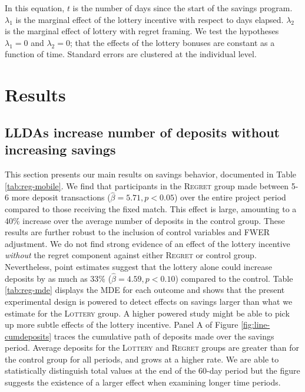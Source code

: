 \documentclass[12pt]{article}
\begin{document}
		In this equation, $t$ is the number of days since the start of the savings program. $\lambda_1$ is the marginal effect of the lottery incentive with respect to days elapsed. $\lambda_2$ is the marginal effect of lottery with regret framing. We test the hypotheses $\lambda_1 = 0$ and $\lambda_2 = 0$; that the effects of the lottery bonuses are constant as a function of time.  Standard errors are clustered at the individual level.

\section{Results} \label{sec:results}


	\subsection{LLDAs increase number of deposits without increasing savings}

		This section presents our main results on savings behavior, documented in Table \ref{tab:reg-mobile}. We find that participants in the \textsc{Regret} group made between 5-6 more deposit transactions ($\hat \beta = 5.71, p < 0.05$) over the entire project period compared to those receiving the fixed match. This effect is large, amounting to a 40\% increase over the average number of deposits in the control group. These results are further robust to the inclusion of control variables and FWER adjustment. We do not find strong evidence of an effect of the lottery incentive \textit{without} the regret component against either \textsc{Regret} or control group. Nevertheless, point estimates suggest that the lottery alone could increase deposits by as much as 33\% ($\hat \beta = 4.59, p < 0.10$) compared to the control. Table \ref{tab:reg-mde} displays the MDE for each outcome and shows that the present experimental design is powered to detect effects on savings larger than what we estimate for the \textsc{Lottery} group. A higher powered study might be able to pick up more subtle effects of the lottery incentive. Panel A of Figure \ref{fig:line-cumdeposits} traces the cumulative path of deposits made over the savings period. Average deposits for the \textsc{Lottery} and \textsc{Regret} groups are greater than for the control group for all periods, and grows at a higher rate. We are able to statistically distinguish total values at the end of the 60-day period but the figure suggests the existence of a larger effect when examining longer time periods.
\end{document}
